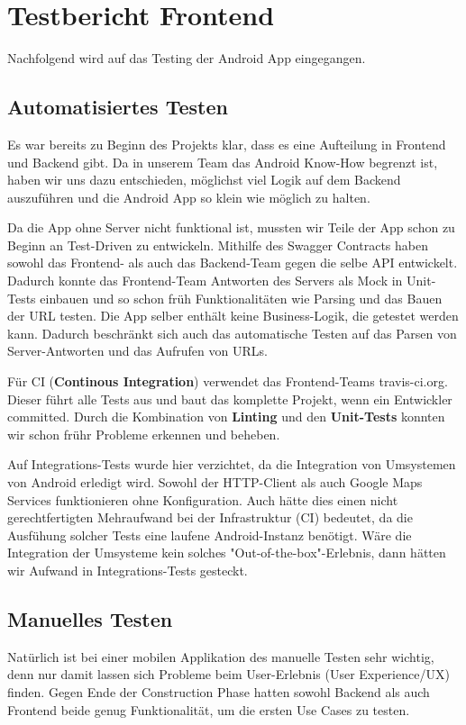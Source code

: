 \section{Testbericht Frontend}\label{testbericht_frontend}
Nachfolgend wird auf das Testing der Android App eingegangen.

\subsection{Automatisiertes Testen}\label{automatisiertes_test_frontend}
Es war bereits zu Beginn des Projekts klar, dass es eine Aufteilung in Frontend und Backend
gibt. Da in unserem Team das Android Know-How begrenzt ist, haben wir uns dazu entschieden, 
möglichst viel Logik auf dem Backend auszuführen und die Android App so klein wie möglich zu halten.

Da die App ohne Server nicht funktional ist, mussten wir Teile der App schon zu Beginn an
Test-Driven zu entwickeln. Mithilfe des Swagger Contracts haben sowohl das Frontend- als auch das
Backend-Team gegen die selbe API entwickelt. Dadurch konnte das Frontend-Team Antworten des Servers
als Mock in Unit-Tests einbauen und so schon früh Funktionalitäten wie Parsing und das Bauen der URL
testen. Die App selber enthält keine Business-Logik, die getestet werden kann. Dadurch beschränkt sich
auch das automatische Testen auf das Parsen von Server-Antworten und das Aufrufen von URLs.

Für CI (\textbf{Continous Integration}) verwendet das Frontend-Teams travis-ci.org. Dieser führt alle Tests
aus und baut das komplette Projekt, wenn ein Entwickler committed. Durch die Kombination von \textbf{Linting}
und den \textbf{Unit-Tests} konnten wir schon frühr Probleme erkennen und beheben.

Auf Integrations-Tests wurde hier verzichtet, da die Integration von Umsystemen von Android erledigt
wird. Sowohl der HTTP-Client als auch Google Maps Services funktionieren ohne Konfiguration. Auch hätte
dies einen nicht gerechtfertigten Mehraufwand bei der Infrastruktur (CI) bedeutet, da die Ausfühung 
solcher Tests eine laufene Android-Instanz benötigt. Wäre die Integration der Umsysteme kein solches
"Out-of-the-box"-Erlebnis, dann hätten wir Aufwand in Integrations-Tests gesteckt.

\subsection{Manuelles Testen}\label{manuelles_testen_frontend}
Natürlich ist bei einer mobilen Applikation des manuelle Testen sehr wichtig, denn nur damit lassen
sich Probleme beim User-Erlebnis (User Experience/UX) finden. Gegen Ende der Construction Phase
hatten sowohl Backend als auch Frontend beide genug Funktionalität, um die ersten Use Cases zu testen.

